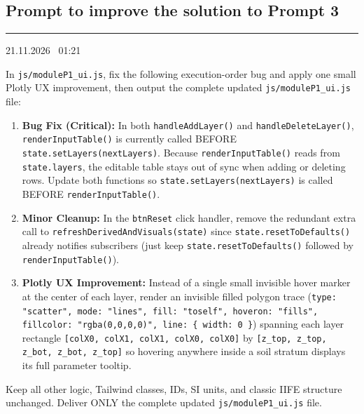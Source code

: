 \documentclass[11pt,a4paper]{article}
\newcommand{\stamp}[1]{{\small\bfseries\color{black!70}\textcolor{accent}{\rule[-2pt]{2pt}{10pt}}\hspace{6pt}#1}\par}
\newcommand{\code}[1]{\texttt{\small #1}}
\begin{document}
\subsection{Prompt to improve the solution to Prompt 3}
\stamp{21.11.2026 \textbar\ 01:21}
\begin{prompt}
In \code{js/moduleP1\_ui.js}, fix the following execution-order bug and apply one small Plotly UX improvement, then
output the complete updated \code{js/moduleP1\_ui.js} file:
\begin{enumerate}
\item \textbf{Bug Fix (Critical):} In both \code{handleAddLayer()} and \code{handleDeleteLayer()},
  \code{renderInputTable()} is currently called BEFORE \code{state.setLayers(nextLayers)}. Because
  \code{renderInputTable()} reads from \code{state.layers}, the editable table stays out of sync when adding or
  deleting rows. Update both functions so \code{state.setLayers(nextLayers)} is called BEFORE
  \code{renderInputTable()}.
\item \textbf{Minor Cleanup:} In the \code{btnReset} click handler, remove the redundant extra call to
  \code{refreshDerivedAndVisuals(state)} since \code{state.resetToDefaults()} already notifies subscribers (just keep
  \code{state.resetToDefaults()} followed by \code{renderInputTable()}).
\item \textbf{Plotly UX Improvement:} Instead of a single small invisible hover marker at the center of each layer,
  render an invisible filled polygon trace (\code{type: "scatter", mode: "lines", fill: "toself", hoveron: "fills",
  fillcolor: "rgba(0,0,0,0)", line: \{ width: 0 \}}) spanning each layer rectangle \code{[colX0, colX1, colX1, colX0,
  colX0]} by \code{[z\_top, z\_top, z\_bot, z\_bot, z\_top]} so hovering anywhere inside a soil stratum displays its
  full parameter tooltip.
\end{enumerate}
Keep all other logic, Tailwind classes, IDs, SI units, and classic IIFE structure unchanged. Deliver ONLY the complete
updated \code{js/moduleP1\_ui.js} file.
\end{prompt}
\end{document}
